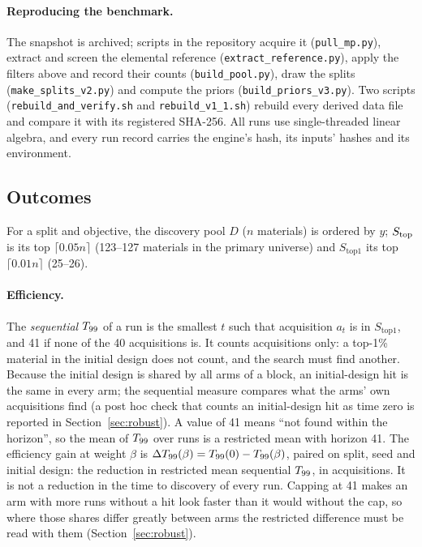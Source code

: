 \paragraph{Reproducing the benchmark.} The snapshot is archived\cite{asad2026snapshot}; scripts in the repository acquire it
(\texttt{pull\_mp.py}), extract and screen the elemental reference (\texttt{extract\_reference.py}), apply the filters above and
record their counts (\texttt{build\_pool.py}), draw the splits (\texttt{make\_splits\_v2.py}) and compute the priors
(\texttt{build\_priors\_v3.py}). Two scripts (\texttt{rebuild\_and\_verify.sh} and \texttt{rebuild\_v1\_1.sh}) rebuild every derived data file and compare it
with its registered SHA-256. All runs
use single-threaded linear algebra, and every run record carries the engine's hash, its inputs' hashes and its environment.

\subsection{Outcomes}\label{sec:outcomes}
For a split and objective, the discovery pool $D$ ($n$ materials) is ordered by $y$; $S_{\mathrm{top}}$ is its top $\lceil0.05n\rceil$
(123--127 materials in the primary universe) and $S_{\mathrm{top1}}$ its top $\lceil0.01n\rceil$ (25--26).

\paragraph{Efficiency.} The \emph{sequential} $T_{99}$ of a run is the smallest $t$ such that acquisition $a_t$ is in
$S_{\mathrm{top1}}$, and 41 if none of the 40 acquisitions is. It counts acquisitions only: a top-1\% material in the initial design
does not count, and the search must find another. Because the initial design is shared by all arms of a block, an initial-design
hit is the same in every arm; the sequential measure compares what the arms' own acquisitions find (a post hoc check that counts an
initial-design hit as time zero is reported in Section~\ref{sec:robust}). A value of 41 means ``not found within the horizon'', so the mean of $T_{99}$
over runs is a restricted mean with horizon 41. The efficiency gain at weight $\beta$ is $\Delta T_{99}(\beta)=T_{99}(0)-T_{99}(\beta)$,
paired on split, seed and initial design: the reduction in restricted mean sequential $T_{99}$, in acquisitions. It is not a
reduction in the time to discovery of every run. Capping at 41 makes an arm with more runs without a hit look faster than it
would without the cap, so where those shares differ greatly between arms the restricted difference must be read with them
(Section~\ref{sec:robust}).

